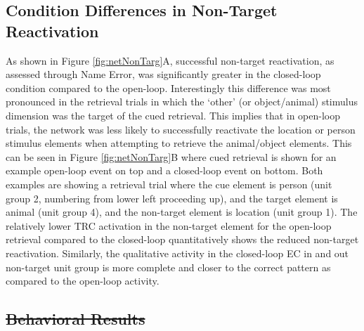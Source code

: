 \documentclass[11pt, titlepage, twoside]{article}
\providecommand{\DIFdel}[1]{{\protect\color{red}\sout{#1}}}                      %
\providecommand{\DIFdelbegin}{} %
\begin{document}
\subsection{Condition Differences in Non-Target Reactivation}
As shown in Figure \ref{fig:netNonTarg}A, successful non-target reactivation, as assessed through Name Error, was significantly greater in the closed-loop condition compared to the open-loop.  Interestingly this difference was most pronounced in the retrieval trials in which the `other' (or object/animal) stimulus dimension was the target of the cued retrieval.  This implies that in open-loop trials, the network was less likely to successfully reactivate  the location or person stimulus elements when attempting to retrieve the animal/object elements.  This can be seen in Figure \ref{fig:netNonTarg}B where cued retrieval is shown for an example open-loop event on top and a closed-loop event on bottom.  Both examples are showing a retrieval trial where the cue element is person (unit group 2, numbering from lower left proceeding up), and the target element is animal (unit group 4), and the non-target element is location (unit group 1).  The relatively lower TRC activation in the non-target element for the open-loop retrieval compared to the closed-loop quantitatively shows the reduced non-target reactivation.  Similarly, the qualitative activity in the closed-loop EC in and out non-target unit group is more complete and closer to the correct pattern as compared to the open-loop activity.


\DIFdelbegin \subsection{\DIFdel{Behavioral Results}}%
\addtocounter{subsection}{-1}%
\end{document}
